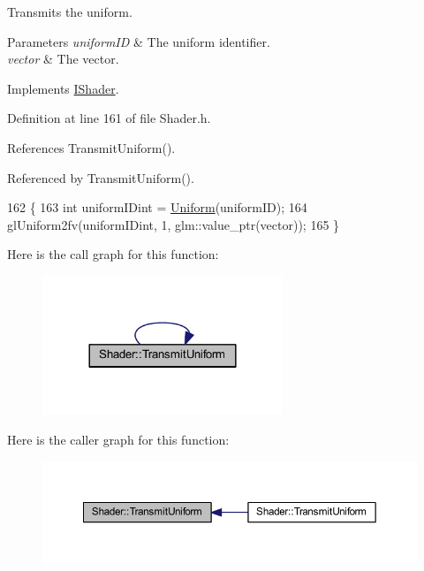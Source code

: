 Transmits the uniform. 


\begin{DoxyParams}{Parameters}
{\em uniform\+ID} & The uniform identifier.\\
\hline
{\em vector} & The vector.\\
\hline
\end{DoxyParams}


Implements \hyperlink{class_i_shader_a756ed010b22051eb1b9ef01f913473b1}{I\+Shader}.



Definition at line 161 of file Shader.\+h.



References Transmit\+Uniform().



Referenced by Transmit\+Uniform().


\begin{DoxyCode}
162   \{
163     \textcolor{keywordtype}{int} uniformIDint = \hyperlink{class_shader_a37f108fd8b105ebadad3a14ac1ff517f}{Uniform}(uniformID);
164     glUniform2fv(uniformIDint, 1, glm::value\_ptr(vector));
165   \}
\end{DoxyCode}


Here is the call graph for this function\+:\nopagebreak
\begin{figure}[H]
\begin{center}
\leavevmode
\includegraphics[width=204pt]{class_shader_a9abf3c1e4b53531bf60140b73ba327b2_cgraph}
\end{center}
\end{figure}




Here is the caller graph for this function\+:
\nopagebreak
\begin{figure}[H]
\begin{center}
\leavevmode
\includegraphics[width=350pt]{class_shader_a9abf3c1e4b53531bf60140b73ba327b2_icgraph}
\end{center}
\end{figure}


